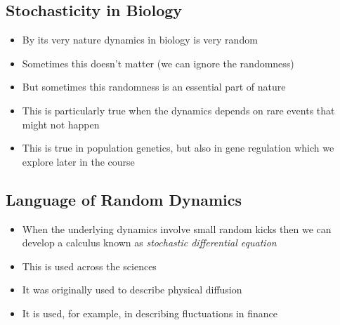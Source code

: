 
\begin{slide}
\section{Stochasticity in Biology}

\begin{PauseHighLight}
  \begin{itemize}
  \item By its very nature dynamics in biology is very random\pause
  \item Sometimes this doesn't matter (we can ignore the
    randomness)\pause
  \item But sometimes this randomness is an essential part of
    nature\pause
  \item This is particularly true when the dynamics depends on rare
    events that might not happen\pause
  \item This is true in population genetics, but also in gene regulation
    which we explore later in the course\pause
  \end{itemize}
\end{PauseHighLight}

\end{slide}


\begin{slide}
\section{Language of Random Dynamics}

\begin{PauseHighLight}
  \begin{itemize}
  \item When the underlying dynamics involve small random kicks then we
    can develop a calculus known as \emph{stochastic differential
      equation}\pause
  \item This is used across the sciences\pause
  \item It was originally used to describe physical diffusion\pause
  \item It is used, for example, in describing fluctuations in
    finance\pause
  \end{itemize}
\end{PauseHighLight}

\end{slide}


